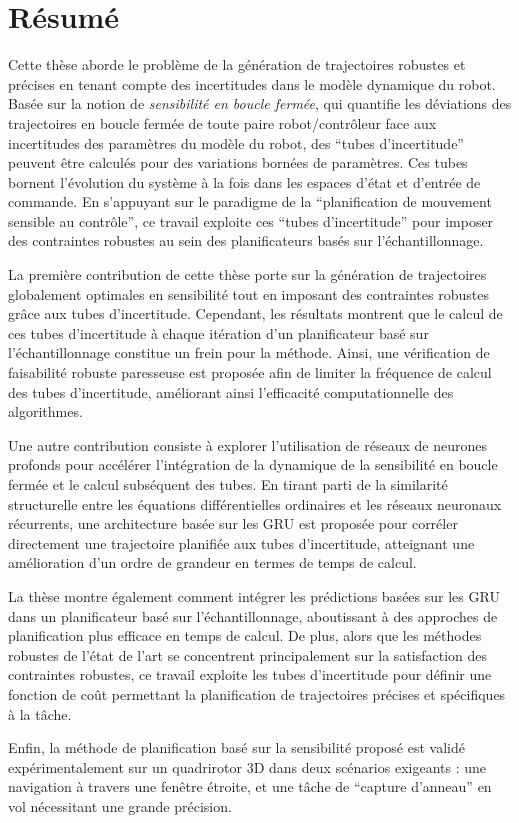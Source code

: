 \chapter*{Résumé}

Cette thèse aborde le problème de la génération de trajectoires robustes et précises en tenant compte des incertitudes dans le modèle dynamique du robot.
Basée sur la notion de \emph{sensibilité en boucle fermée}, qui quantifie les déviations des trajectoires en boucle fermée de toute paire robot/contrôleur face aux incertitudes des paramètres du modèle du robot, des ``tubes d'incertitude'' peuvent être calculés pour des variations bornées de paramètres. 
Ces tubes bornent l'évolution du système à la fois dans les espaces d'état et d'entrée de commande. 
En s'appuyant sur le paradigme de la ``planification de mouvement sensible au contrôle'', ce travail exploite ces ``tubes d'incertitude'' pour imposer des contraintes robustes au sein des planificateurs basés sur l'échantillonnage.

La première contribution de cette thèse porte sur la génération de trajectoires globalement optimales en sensibilité tout en imposant des contraintes robustes grâce aux tubes d'incertitude.
Cependant, les résultats montrent que le calcul de ces tubes d'incertitude à chaque itération d'un planificateur basé sur l'échantillonnage constitue un frein pour la méthode.
Ainsi, une vérification de faisabilité robuste paresseuse est proposée afin de limiter la fréquence de calcul des tubes d'incertitude, améliorant ainsi l'efficacité computationnelle des algorithmes.

Une autre contribution consiste à explorer l'utilisation de réseaux de neurones profonds pour accélérer l'intégration de la dynamique de la sensibilité en boucle fermée et le calcul subséquent des tubes.
En tirant parti de la similarité structurelle entre les équations différentielles ordinaires et les réseaux neuronaux récurrents, une architecture basée sur les GRU est proposée pour corréler directement une trajectoire planifiée aux tubes d'incertitude, atteignant une amélioration d'un ordre de grandeur en termes de temps de calcul.

La thèse montre également comment intégrer les prédictions basées sur les GRU dans un planificateur basé sur l'échantillonnage, aboutissant à des approches de planification plus efficace en temps de calcul.
De plus, alors que les méthodes robustes de l'état de l'art se concentrent principalement sur la satisfaction des contraintes robustes, ce travail exploite les tubes d'incertitude pour définir une fonction de coût permettant la planification de trajectoires précises et spécifiques à la tâche.

Enfin, la méthode de planification basé sur la sensibilité proposé est validé expérimentalement sur un quadrirotor 3D dans deux scénarios exigeants : une navigation à travers une fenêtre étroite, et une tâche de ``capture d'anneau'' en vol nécessitant une grande précision. 